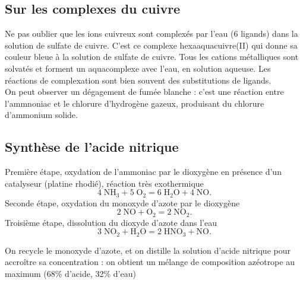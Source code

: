 \documentclass[11pt,a4paper]{report}
\begin{document}
\subsection*{Sur les complexes du cuivre}

Ne pas oublier que les ions cuivreux sont complexés par l'eau (6 ligands) dans la solution de sulfate de cuivre. C'est ce complexe hexaaquacuivre(II) qui donne sa couleur bleue à la solution de sulfate de cuivre. Tous les cations métalliques sont solvatés et forment un aquacomplexe avec l'eau, en solution aqueuse. Les réactions de complexation sont bien souvent des substitutions de ligands.\\

On peut observer un dégagement de fumée blanche : c'est une réaction entre l'ammnoniac et le chlorure d'hydrogène gazeux, produisant du chlorure d'ammonium solide.

\subsection*{Synthèse de l'acide nitrique}

Première étape, oxydation de l'ammoniac par le dioxygène en présence d'un catalyseur (platine rhodié), réaction très exothermique
\begin{equation}
	4\;\text{NH}_3 + 5\;\text{O}_2 = 6\;\text{H}_2\text{O} + 4\;\text{NO}.
\end{equation}
Seconde étape, oxydation du monoxyde d'azote par le dioxygène
\begin{equation}
	2\;\text{NO} + \text{O}_2 = 2\;\text{NO}_2.
\end{equation}
Troisième étape, dissolution du dioxyde d'azote dans l'eau
\begin{equation}
	3\;\text{NO}_2 + \text{H}_2\text{O} = 2\;\text{HNO}_3 + \text{NO}.
\end{equation}

On recycle le monoxyde d'azote, et on distille la solution d'acide nitrique pour accroître sa concentration : on obtient un mélange de composition azéotrope au maximum (68\% d'acide, 32\% d'eau)
\end{document}
